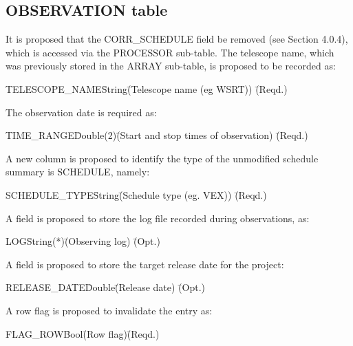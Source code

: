 \documentclass{article}
\begin{document}
\subsection{OBSERVATION table}

It is proposed that the CORR\_SCHEDULE field be removed (see Section
4.0.4), which is accessed via the PROCESSOR sub-table. The telescope
name, which was previously stored in the ARRAY sub-table, is proposed
to be recorded as:

\begin{tabbing} 
TELESCOPE\_NAME\quad\quad \= String\quad\quad \= (Telescope name (eg WSRT))
 \quad\quad \= (Reqd.) \\
\end{tabbing}

The observation date is required as:

\begin{tabbing} 
TIME\_RANGE\quad\quad \= Double(2)\quad\quad \= 
(Start and stop times of observation)
 \quad\quad \= (Reqd.) \\
\end{tabbing}

A new column is proposed to identify the type of the unmodified
schedule summary is SCHEDULE, namely:

\begin{tabbing} 
SCHEDULE\_TYPE\quad\quad \= String\quad\quad \= 
(Schedule type (eg. VEX)) \quad\quad \= (Reqd.) \\
\end{tabbing}

A field is proposed to store the log file recorded during observations, as:

\begin{tabbing}
LOG\quad\quad \= String(*)\quad\quad \= (Observing log)
 \quad\quad \= (Opt.) \\
\end{tabbing}

A field is proposed to store the target release date for the project:

\begin{tabbing}
RELEASE\_DATE\quad\quad \= Double\quad\quad \= (Release date)
 \quad\quad \= (Opt.) \\
\end{tabbing}

A row flag is proposed to invalidate the entry as:

\begin{tabbing}
FLAG\_ROW\quad\quad \= Bool\quad\quad \= (Row flag)\quad\quad \= (Reqd.)\\
\end{tabbing}
\end{document}
